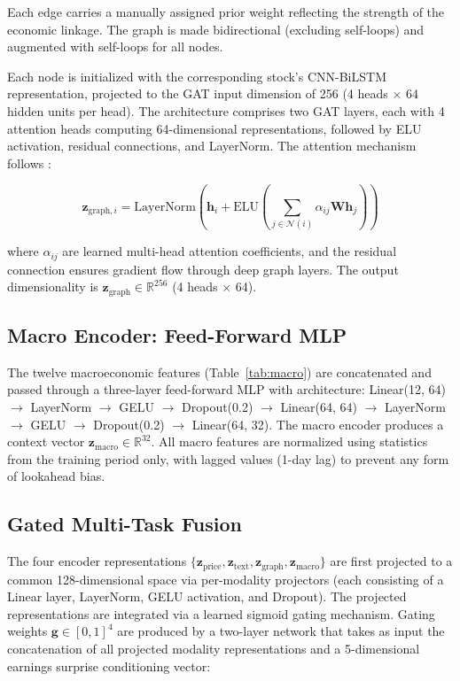 \documentclass[12pt, a4paper]{article}
\begin{document}
Each edge carries a manually assigned prior weight reflecting the strength of the economic linkage. The graph is made bidirectional (excluding self-loops) and augmented with self-loops for all nodes.

Each node is initialized with the corresponding stock's CNN-BiLSTM representation, projected to the GAT input dimension of 256 (4 heads $\times$ 64 hidden units per head). The architecture comprises two GAT layers, each with 4 attention heads computing 64-dimensional representations, followed by ELU activation, residual connections, and LayerNorm. The attention mechanism follows \citet{velivckovic2018graph}:

\begin{equation}
    \mathbf{z}_{\text{graph},i} = \text{LayerNorm}\!\left(\mathbf{h}_i + \text{ELU}\!\left( \sum_{j \in \mathcal{N}(i)} \alpha_{ij} \mathbf{W} \mathbf{h}_j \right)\right)
\end{equation}

where $\alpha_{ij}$ are learned multi-head attention coefficients, and the residual connection ensures gradient flow through deep graph layers. The output dimensionality is $\mathbf{z}_{\text{graph}} \in \mathbb{R}^{256}$ (4 heads $\times$ 64).

\subsection{Macro Encoder: Feed-Forward MLP}

The twelve macroeconomic features (Table~\ref{tab:macro}) are concatenated and passed through a three-layer feed-forward MLP with architecture: Linear(12, 64) $\to$ LayerNorm $\to$ GELU $\to$ Dropout(0.2) $\to$ Linear(64, 64) $\to$ LayerNorm $\to$ GELU $\to$ Dropout(0.2) $\to$ Linear(64, 32). The macro encoder produces a context vector $\mathbf{z}_{\text{macro}} \in \mathbb{R}^{32}$. All macro features are normalized using statistics from the training period only, with lagged values (1-day lag) to prevent any form of lookahead bias.

\subsection{Gated Multi-Task Fusion}

The four encoder representations $\{\mathbf{z}_{\text{price}}, \mathbf{z}_{\text{text}}, \mathbf{z}_{\text{graph}}, \mathbf{z}_{\text{macro}}\}$ are first projected to a common 128-dimensional space via per-modality projectors (each consisting of a Linear layer, LayerNorm, GELU activation, and Dropout). The projected representations are integrated via a learned sigmoid gating mechanism. Gating weights $\mathbf{g} \in [0,1]^4$ are produced by a two-layer network that takes as input the concatenation of all projected modality representations and a 5-dimensional earnings surprise conditioning vector:
\end{document}
